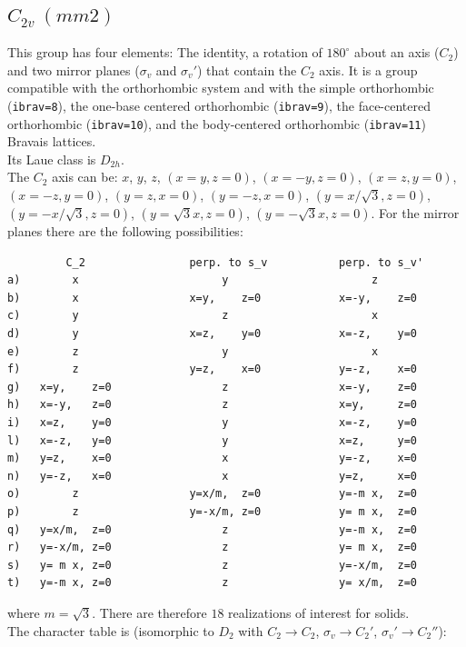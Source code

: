 \documentclass[12pt,a4paper]{article}
\begin{document}
\subsection{\color{web-blue}$C_{2v}\ (mm2)$} 
This group has four elements: The identity, a rotation of $180^\circ$ about
an axis ($C_2$) and two mirror planes ($\sigma_v$ and $\sigma_v'$) that contain 
the $C_2$ axis.
It is a group compatible with the orthorhombic system and with the
simple orthorhombic (\texttt{ibrav=8}), the one-base centered
orthorhombic (\texttt{ibrav=9}), the face-centered orthorhombic 
(\texttt{ibrav=10}), and the body-centered orthorhombic (\texttt{ibrav=11}) 
Bravais lattices.\\
Its Laue class is $D_{2h}$. \\
The $C_2$ axis can be:
$x$, $y$, $z$, $(x=y, z=0)$, $(x=-y, z=0)$, $(x=z, y=0)$, $(x=-z, y=0)$,
$(y=z, x=0)$, $(y=-z, x=0)$, $(y=x/\sqrt{3}, z=0)$, $(y=-x/\sqrt{3}, z=0)$, 
$(y=\sqrt{3}x, z=0)$, $(y=-\sqrt{3}x, z=0)$. For the mirror planes there are
the following possibilities:
\begin{verbatim}
         C_2                perp. to s_v           perp. to s_v'
a)        x                      y                      z 
b)        x                 x=y,    z=0            x=-y,    z=0
c)        y                      z                      x
d)        y                 x=z,    y=0            x=-z,    y=0
e)        z                      y                      x              
f)        z                 y=z,    x=0            y=-z,    x=0 
g)   x=y,    z=0                 z                 x=-y,    z=0 
h)   x=-y,   z=0                 z                 x=y,     z=0
i)   x=z,    y=0                 y                 x=-z,    y=0
l)   x=-z,   y=0                 y                 x=z,     y=0
m)   y=z,    x=0                 x                 y=-z,    x=0
n)   y=-z,   x=0                 x                 y=z,     x=0
o)        z                 y=x/m,  z=0            y=-m x,  z=0     
p)        z                 y=-x/m, z=0            y= m x,  z=0     
q)   y=x/m,  z=0                 z                 y=-m x,  z=0
r)   y=-x/m, z=0                 z                 y= m x,  z=0
s)   y= m x, z=0                 z                 y=-x/m,  z=0
t)   y=-m x, z=0                 z                 y= x/m,  z=0
\end{verbatim}
where $m=\sqrt{3}$.
There are therefore $18$ realizations of interest for solids. \\
The character table is (isomorphic to $D_2$ with $C_2 \rightarrow C_2$,
$\sigma_v \rightarrow C_2'$, $\sigma_v' \rightarrow C_2''$):
\end{document}

